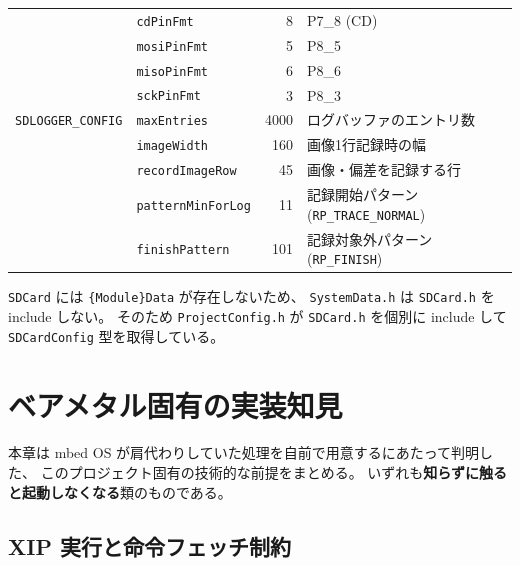 \documentclass[a4paper,11pt,dvipdfmx]{jsarticle}
\begin{document}
\begin{longtable}{l l r p{62mm}}
                          & \texttt{cdPinFmt}         & 8      & P7\_8 (CD) \\
                          & \texttt{mosiPinFmt}       & 5      & P8\_5 \\
                          & \texttt{misoPinFmt}       & 6      & P8\_6 \\
                          & \texttt{sckPinFmt}        & 3      & P8\_3 \\
\midrule
\texttt{SDLOGGER\_CONFIG} & \texttt{maxEntries}       & 4000   & ログバッファのエントリ数 \\
                          & \texttt{imageWidth}       & 160    & 画像1行記録時の幅 \\
                          & \texttt{recordImageRow}   & 45     & 画像・偏差を記録する行 \\
                          & \texttt{patternMinForLog} & 11     & 記録開始パターン (\texttt{RP\_TRACE\_NORMAL}) \\
                          & \texttt{finishPattern}    & 101    & 記録対象外パターン (\texttt{RP\_FINISH}) \\
\bottomrule
\end{longtable}

\begin{notebox}
\texttt{SDCard} には \texttt{\{Module\}Data} が存在しないため、
\texttt{SystemData.h} は \texttt{SDCard.h} を include しない。
そのため \texttt{ProjectConfig.h} が \texttt{SDCard.h} を個別に include して
\texttt{SDCardConfig} 型を取得している。
\end{notebox}

\section{ベアメタル固有の実装知見}\label{sec:baremetal}

本章は mbed OS が肩代わりしていた処理を自前で用意するにあたって判明した、
このプロジェクト固有の技術的な前提をまとめる。
いずれも\textbf{知らずに触ると起動しなくなる}類のものである。

\subsection{XIP 実行と命令フェッチ制約}\label{sec:xip}
\end{document}
